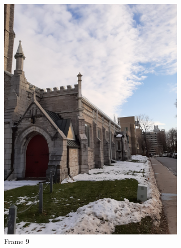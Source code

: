 \documentclass[conference]{IEEEtran}
\begin{document}
\begin{figure}[!h]
\begin{subfigure}[b]{0.2\linewidth}
    \includegraphics[width=\linewidth, angle = -90]{images/frame9.jpg}
     \caption{Frame 9}
  \end{subfigure}
  \begin{subfigure}[b]{0.2\linewidth}

\end{subfigure}
\end{figure}
\end{document}
